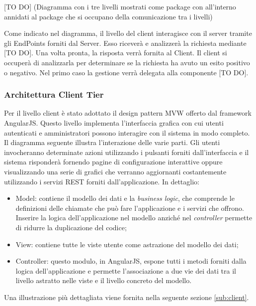		[TO DO] (Diagramma con i tre livelli mostrati come package con all'interno annidati al package che si occupano della comunicazione tra i livelli) \newline \newline
		
		Come indicato nel diagramma, il livello del client interagisce con il server tramite gli EndPoints forniti dal Server. Esso riceverà e analizzerà la richiesta mediante [TO DO]. Una volta pronta, la risposta verrà fornita al Client.\newline
		Il client si occuperà di analizzarla per determinare se la richiesta ha avuto un esito positivo o negativo. Nel primo caso la gestione verrà delegata alla componente [TO DO]. \newline



		\subsubsection{Architettura Client Tier}
		Per il livello client è stato adottato il design pattern MVW offerto dal framework AngularJS. Questo livello implementa l'interfaccia grafica con cui utenti autenticati e amministratori possono interagire con il sistema in modo completo. Il diagramma seguente illustra l'interazione delle varie parti. \newline
		Gli utenti invocheranno determinate azioni utilizzando i pulsanti forniti dall'interfaccia e il sistema risponderà fornendo pagine di configurazione interattive oppure visualizzando una serie di grafici che verranno aggiornanti costantemente utilizzando i servizi REST forniti dall'applicazione. In dettaglio:
		\begin{itemize}
			\item Model: contiene il modello dei dati e la \textit{business logic}, che comprende le definizioni delle chiamate che può fare l'applicazione e i servizi che offrono. Inserire la logica dell'applicazione nel modello anziché nel \textit{controller} permette di ridurre la duplicazione del codice;
			\item View: contiene tutte le viste utente come astrazione del modello dei dati;
			\item Controller: questo modulo, in AngularJS, espone tutti i metodi forniti dalla logica dell'applicazione e permette l'associazione a due vie dei dati tra il livello astratto nelle viste e il livello concreto del modello.
		\end{itemize}
		\noindent
		Una illustrazione più dettagliata viene fornita nella seguente sezione \ref{sub:client}.

